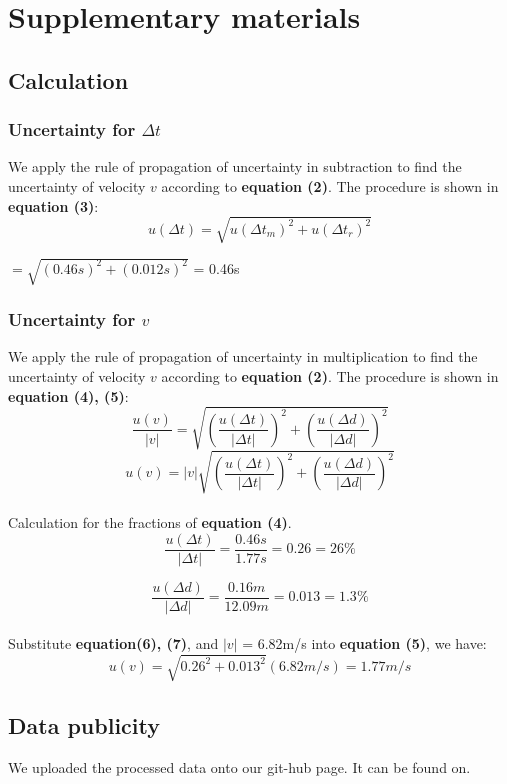 \documentclass[10pt,twocolumn,letterpaper]{article}
\begin{document}
\section{Supplementary materials}
\subsection{Calculation}
\subsubsection{Uncertainty for $\Delta t$}
We apply the rule of propagation of uncertainty in subtraction to find the uncertainty of velocity $v$ according to \textbf{equation (2)}. The procedure is shown in \textbf{equation (3)}:
\begin{equation}
	u(\Delta t) = \sqrt{u(\Delta t_m)^2 + u(\Delta t_r)^2}
\end{equation}
\begin{center}
	$= \sqrt{(0.46s)^2 + (0.012s)^2}$ = 0.46s
\end{center}
\subsubsection{Uncertainty for $v$}
We apply the rule of propagation of uncertainty in multiplication to find the uncertainty of velocity $v$ according to \textbf{equation (2)}. The procedure is shown in \textbf{equation (4), (5)}:
\begin{equation}
	\frac{u(v)}{|v|} = \sqrt{(\frac{u(\Delta t)}{|\Delta t|})^2 + (\frac{u(\Delta d)}{|\Delta d|})^2}
\end{equation}
\begin{equation}
	u(v) = |v|\sqrt{(\frac{u(\Delta t)}{|\Delta t|})^2 + (\frac{u(\Delta d)}{|\Delta d|})^2}
\end{equation}
\\Calculation for the fractions of \textbf{equation (4)}.
\begin{equation}
	\frac{u(\Delta t)}{|\Delta t|} = \frac{0.46s}{1.77s} = 0.26 = 26\%
\end{equation}
	
\begin{equation}
	\frac{u(\Delta d)}{|\Delta d|} = \frac{0.16m}{12.09m} = 0.013 = 1.3\%
\end{equation}
\\Substitute \textbf{equation(6), (7)}, and $|v|$ = 6.82m/s into \textbf{equation (5)}, we have:
\begin{equation}
	u(v) = \sqrt{0.26^2+0.013^2}(6.82m/s) = 1.77m/s
\end{equation}
\subsection{Data publicity}
We uploaded the processed data onto our git-hub page. It can be found on.
\end{document}
